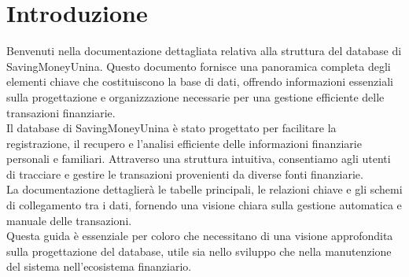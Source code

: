\chapter{Introduzione}

Benvenuti nella documentazione dettagliata relativa alla struttura
del database di SavingMoneyUnina. Questo documento fornisce una panoramica
completa degli elementi chiave che costituiscono la base di dati,
offrendo informazioni essenziali sulla progettazione e organizzazione
necessarie per una gestione efficiente delle transazioni finanziarie.\\

Il database di SavingMoneyUnina è stato progettato per
facilitare la registrazione, il recupero e l'analisi
efficiente delle informazioni finanziarie personali e familiari.
Attraverso una struttura intuitiva, consentiamo agli utenti di tracciare
e gestire le transazioni provenienti da diverse fonti finanziarie.\\

La documentazione dettaglierà le tabelle principali, le relazioni chiave
e gli schemi di collegamento tra i dati, fornendo una visione chiara sulla
gestione automatica e manuale delle transazioni.\\

Questa guida è essenziale per coloro che necessitano di una visione
approfondita sulla progettazione del database, utile sia nello sviluppo
che nella manutenzione del sistema nell'ecosistema finanziario.